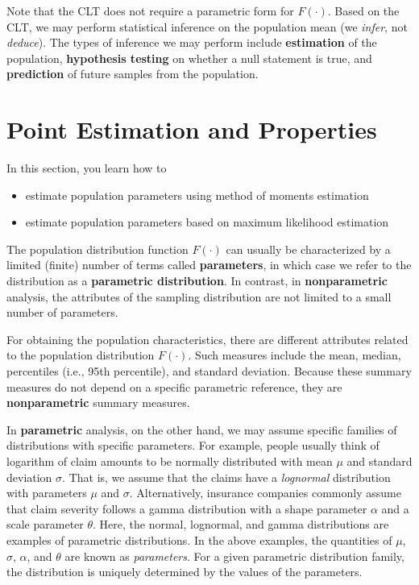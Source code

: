 \documentclass[]{book}
\providecommand{\tightlist}{%
  \setlength{\itemsep}{0pt}\setlength{\parskip}{0pt}}
\theoremstyle{definition}
\theoremstyle{definition}
\theoremstyle{definition}
\theoremstyle{remark}
\begin{document}
Note that the CLT does not require a parametric form for \(F(\cdot)\).
Based on the CLT, we may perform statistical inference on the population
mean (we \emph{infer}, not \emph{deduce}). The types of inference we may
perform include \textbf{estimation} of the population,
\textbf{hypothesis testing} on whether a null statement is true, and
\textbf{prediction} of future samples from the population.

\section{Point Estimation and Properties}\label{S:AppA:PE}

In this section, you learn how to

\begin{itemize}
\tightlist
\item
  estimate population parameters using method of moments estimation
\item
  estimate population parameters based on maximum likelihood estimation
\end{itemize}

The population distribution function \(F(\cdot)\) can usually be
characterized by a limited (finite) number of terms called
\textbf{parameters}, in which case we refer to the distribution as a
\textbf{parametric distribution}. In contrast, in \textbf{nonparametric}
analysis, the attributes of the sampling distribution are not limited to
a small number of parameters.

For obtaining the population characteristics, there are different
attributes related to the population distribution \(F(\cdot)\). Such
measures include the mean, median, percentiles (i.e., 95th percentile),
and standard deviation. Because these summary measures do not depend on
a specific parametric reference, they are \textbf{nonparametric} summary
measures.

In \textbf{parametric} analysis, on the other hand, we may assume
specific families of distributions with specific parameters. For
example, people usually think of logarithm of claim amounts to be
normally distributed with mean \(\mu\) and standard deviation
\(\sigma\). That is, we assume that the claims have a \emph{lognormal}
distribution with parameters \(\mu\) and \(\sigma\). Alternatively,
insurance companies commonly assume that claim severity follows a gamma
distribution with a shape parameter \(\alpha\) and a scale parameter
\(\theta\). Here, the normal, lognormal, and gamma distributions are
examples of parametric distributions. In the above examples, the
quantities of \(\mu\), \(\sigma\), \(\alpha\), and \(\theta\) are known
as \emph{parameters}. For a given parametric distribution family, the
distribution is uniquely determined by the values of the parameters.
\end{document}

